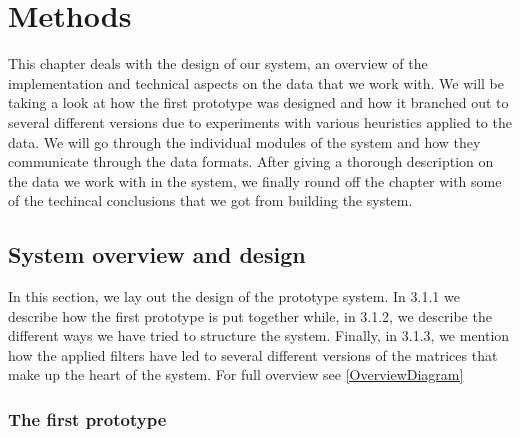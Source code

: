 \chapter{Methods\label{Methods}}

This chapter deals with the design of our system, an overview of the
implementation and technical aspects on the data that we work with. We
will be taking a look at how the first prototype was designed and how
it branched out to several different versions due to experiments with
various heuristics applied to the data. We will go through the
individual modules of the system and how they communicate through the
data formats. After giving a thorough description on the data we work
with in the system, we finally round off the chapter with some of the
techincal conclusions that we got from building the system.

\section{System overview and design\label{SystemOverviewAndDesign}}

In this section, we lay out the design of the prototype system. In
3.1.1 we describe how the first prototype is put together while, in
3.1.2, we describe the different ways we have tried to structure the
system. Finally, in 3.1.3, we mention how the applied filters have led
to several different versions of the matrices that make up the heart
of the system. For full overview see \ref{OverviewDiagram}

\subsection{The first prototype}

